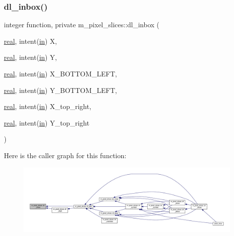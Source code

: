 \subsubsection{\texorpdfstring{dl\+\_\+inbox()}{dl\_inbox()}}
{\footnotesize\ttfamily integer function, private m\+\_\+pixel\+\_\+slices\+::dl\+\_\+inbox (\begin{DoxyParamCaption}\item[{\hyperlink{read__watch_83_8txt_abdb62bde002f38ef75f810d3a905a823}{real}, intent(\hyperlink{M__journal_83_8txt_afce72651d1eed785a2132bee863b2f38}{in})}]{X,  }\item[{\hyperlink{read__watch_83_8txt_abdb62bde002f38ef75f810d3a905a823}{real}, intent(\hyperlink{M__journal_83_8txt_afce72651d1eed785a2132bee863b2f38}{in})}]{Y,  }\item[{\hyperlink{read__watch_83_8txt_abdb62bde002f38ef75f810d3a905a823}{real}, intent(\hyperlink{M__journal_83_8txt_afce72651d1eed785a2132bee863b2f38}{in})}]{X\+\_\+\+B\+O\+T\+T\+O\+M\+\_\+\+L\+E\+FT,  }\item[{\hyperlink{read__watch_83_8txt_abdb62bde002f38ef75f810d3a905a823}{real}, intent(\hyperlink{M__journal_83_8txt_afce72651d1eed785a2132bee863b2f38}{in})}]{Y\+\_\+\+B\+O\+T\+T\+O\+M\+\_\+\+L\+E\+FT,  }\item[{\hyperlink{read__watch_83_8txt_abdb62bde002f38ef75f810d3a905a823}{real}, intent(\hyperlink{M__journal_83_8txt_afce72651d1eed785a2132bee863b2f38}{in})}]{X\+\_\+top\+\_\+right,  }\item[{\hyperlink{read__watch_83_8txt_abdb62bde002f38ef75f810d3a905a823}{real}, intent(\hyperlink{M__journal_83_8txt_afce72651d1eed785a2132bee863b2f38}{in})}]{Y\+\_\+top\+\_\+right }\end{DoxyParamCaption})\hspace{0.3cm}{\ttfamily [private]}}

Here is the caller graph for this function\+:
\nopagebreak
\begin{figure}[H]
\begin{center}
\leavevmode
\includegraphics[width=350pt]{namespacem__pixel__slices_aa0de53a25754eab8fff1732aa2f93eba_icgraph}
\end{center}
\end{figure}
\mbox{\label{namespacem__pixel__slices_a4ac8bc6e1f869e60a675611420fee0f7}} 
